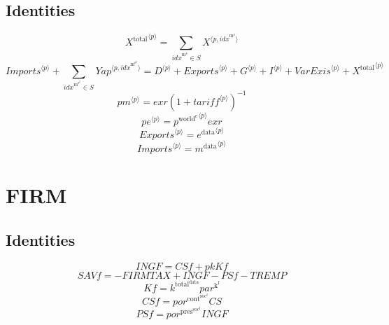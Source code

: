\subsection{Identities}

\begin{equation}
{X^{\mathrm{total}}}^{\langle p\rangle} = \sum_{{i\!d\!x}^{\mathrm{m}^{\mathrm{s}}}\in S} {X}^{\langle p,{i\!d\!x}^{\mathrm{m}^{\mathrm{s}}}\rangle}
\end{equation}
\begin{equation}
{{I\!m\!p\!o\!r\!t\!s}}^{\langle p\rangle} + \sum_{{i\!d\!x}^{\mathrm{m}^{\mathrm{s}^{\mathrm{2}}}}\in S} {{Y\!a\!p}}^{\langle p,{i\!d\!x}^{\mathrm{m}^{\mathrm{s}^{\mathrm{2}}}}\rangle} = {D}^{\langle p\rangle} + {{E\!x\!p\!o\!r\!t\!s}}^{\langle p\rangle} + {G}^{\langle p\rangle} + {I}^{\langle p\rangle} + {{V\!a\!r\!E\!x\!i\!s}}^{\langle p\rangle} + {X^{\mathrm{total}}}^{\langle p\rangle}
\end{equation}
\begin{equation}
{{p\!m}}^{\langle p\rangle} = {{e\!x\!r}} \left(1 + {{t\!a\!r\!i\!f\!f}}^{\langle p\rangle}\right)^{-1}
\end{equation}
\begin{equation}
{{p\!e}}^{\langle p\rangle} = {{p^{\mathrm{world}^{\mathrm{e}}}}^{\langle p\rangle}} {{e\!x\!r}}
\end{equation}
\begin{equation}
{{E\!x\!p\!o\!r\!t\!s}}^{\langle p\rangle} = {e^{\mathrm{data}}}^{\langle p\rangle}
\end{equation}
\begin{equation}
{{I\!m\!p\!o\!r\!t\!s}}^{\langle p\rangle} = {m^{\mathrm{data}}}^{\langle p\rangle}
\end{equation}




\section{FIRM}

\subsection{Identities}

\begin{equation}
{I\!N\!G\!F} = {C\!S\!f} + {{p\!k}} {{K\!f}}
\end{equation}
\begin{equation}
{S\!A\!V\!f} = -{F\!I\!R\!M\!T\!A\!X} + {I\!N\!G\!F} - {P\!S\!f} - {T\!R\!E\!M\!P}
\end{equation}
\begin{equation}
{K\!f} = {k^{\mathrm{total}^{\mathrm{data}}}} {{p\!a\!r}^{\mathrm{k}^{\mathrm{f}}}}
\end{equation}
\begin{equation}
{C\!S\!f} = {{p\!o\!r}^{\mathrm{cont}^{\mathrm{soc}^{\mathrm{f}}}}} {{C\!S}}
\end{equation}
\begin{equation}
{P\!S\!f} = {{p\!o\!r}^{\mathrm{pres}^{\mathrm{soc}^{\mathrm{f}}}}} {{I\!N\!G\!F}}
\end{equation}




